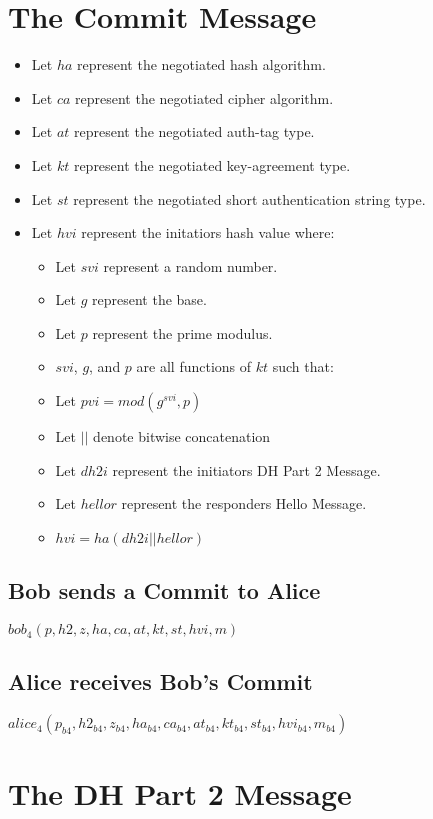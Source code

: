 \documentclass[11pt]{article}
\begin{document}
  \section*{The Commit Message}
  \begin{itemize}
    \item Let $ha$ represent the negotiated hash algorithm.
    \item Let $ca$ represent the negotiated cipher algorithm.
    \item Let $at$ represent the negotiated auth-tag type.
    \item Let $kt$ represent the negotiated key-agreement type.
    \item Let $st$ represent the negotiated short authentication
            string type.
    \item Let $hvi$ represent the initatiors hash value where:
      \begin{itemize}
        \item Let $svi$ represent a random number.
        \item Let $g$ represent the base.
        \item Let $p$ represent the prime modulus.
        \item $svi$, $g$, and $p$ are all functions of $kt$
              such that: 
        \item Let $pvi = mod(g^{svi},p)$
        \item Let $||$ denote bitwise concatenation
        \item Let $dh2i$ represent the initiators DH Part 2 Message.
        \item Let $hellor$ represent the responders Hello Message.
        \item $hvi = ha(dh2i || hellor)$
      \end{itemize}
  \end{itemize}
  \subsection{Bob sends a Commit to Alice}
  $bob_4(p,h2,z,ha,ca,at,kt,st,hvi,m)$
  \subsection{Alice receives Bob's Commit}
  $alice_4(p_{b4},h2_{b4},z_{b4},ha_{b4},ca_{b4},at_{b4},kt_{b4}
    ,st_{b4},hvi_{b4},m_{b4})$
  \section{The DH Part 2 Message}
\end{document}
